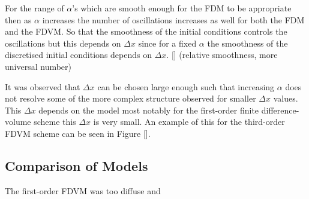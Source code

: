 \documentclass[SingleSpace,12pt,Proceedings]{Serre_ASCE}
\begin{document}
For the range of $\alpha$'s which are smooth enough for the FDM to be appropriate then as $\alpha$ increases the number of oscillations increases as well for both the FDM and the FDVM. So that the smoothness of the initial conditions controls the oscillations but this depends on $\Delta x$ since for a fixed $\alpha$ the smoothness of the discretised initial conditions depends on $\Delta x$. [] (relative smoothness, more universal number)

It was observed that $\Delta x$ can be chosen large enough such that increasing $\alpha$ does not resolve some of the more complex structure observed for smaller $\Delta x$ values. This $\Delta x$ depends on the model most notably for the first-order finite difference-volume scheme this $\Delta x$ is very small. An example of this for the third-order FDVM scheme can be seen in Figure []. 



\subsection{Comparison of Models}
The first-order FDVM was too diffuse and
\end{document}
